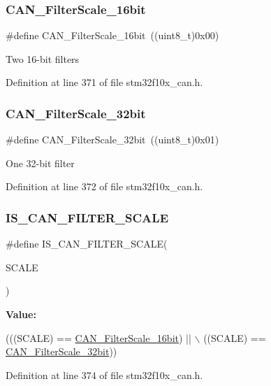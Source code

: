 \subsubsection{\texorpdfstring{C\+A\+N\+\_\+\+Filter\+Scale\+\_\+16bit}{CAN\_FilterScale\_16bit}}
{\footnotesize\ttfamily \#define C\+A\+N\+\_\+\+Filter\+Scale\+\_\+16bit~((uint8\+\_\+t)0x00)}

Two 16-\/bit filters 

Definition at line 371 of file stm32f10x\+\_\+can.\+h.

\mbox{\label{group___c_a_n__filter__scale_gac63dfb0e11713c59268ee9f4aebab60e}} 
\subsubsection{\texorpdfstring{C\+A\+N\+\_\+\+Filter\+Scale\+\_\+32bit}{CAN\_FilterScale\_32bit}}
{\footnotesize\ttfamily \#define C\+A\+N\+\_\+\+Filter\+Scale\+\_\+32bit~((uint8\+\_\+t)0x01)}

One 32-\/bit filter 

Definition at line 372 of file stm32f10x\+\_\+can.\+h.

\mbox{\label{group___c_a_n__filter__scale_gaf64c93166af0eb5ec7e804116f10783a}} 
\subsubsection{\texorpdfstring{I\+S\+\_\+\+C\+A\+N\+\_\+\+F\+I\+L\+T\+E\+R\+\_\+\+S\+C\+A\+LE}{IS\_CAN\_FILTER\_SCALE}}
{\footnotesize\ttfamily \#define I\+S\+\_\+\+C\+A\+N\+\_\+\+F\+I\+L\+T\+E\+R\+\_\+\+S\+C\+A\+LE(\begin{DoxyParamCaption}\item[{}]{S\+C\+A\+LE }\end{DoxyParamCaption})}

{\bfseries Value\+:}
\begin{DoxyCode}
(((SCALE) == \hyperlink{group___c_a_n__filter__scale_ga9e0493937e73bcf9a4127eef2f255a95}{CAN\_FilterScale\_16bit}) || \(\backslash\)
                                    ((SCALE) == \hyperlink{group___c_a_n__filter__scale_gac63dfb0e11713c59268ee9f4aebab60e}{CAN\_FilterScale\_32bit}))
\end{DoxyCode}


Definition at line 374 of file stm32f10x\+\_\+can.\+h.

